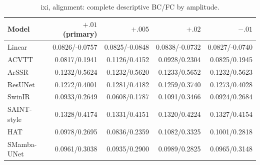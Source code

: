 \begin{table}[t]\centering\scriptsize

\caption{ixi, alignment: complete descriptive BC/FC by amplitude.}

\begin{tabular}{lrrrr}\toprule Model & $+.01$ (primary) & $+.005$ & $+.02$ & $-.01$\\\midrule

Linear & 0.0826/-0.0757 & 0.0825/-0.0848 & 0.0838/-0.0732 & 0.0827/-0.0740\\

ACVTT & 0.0817/0.1941 & 0.1126/0.4152 & 0.0928/0.2304 & 0.0825/0.1945\\

ArSSR & 0.1232/0.5624 & 0.1232/0.5620 & 0.1233/0.5652 & 0.1232/0.5623\\

ResUNet & 0.1272/0.4001 & 0.1281/0.4182 & 0.1259/0.3740 & 0.1273/0.4028\\

SwinIR & 0.0933/0.2649 & 0.0608/0.1787 & 0.1091/0.3466 & 0.0924/0.2684\\

SAINT-style & 0.1328/0.4174 & 0.1331/0.4151 & 0.1320/0.4224 & 0.1327/0.4154\\

HAT & 0.0978/0.2695 & 0.0836/0.2359 & 0.1082/0.3325 & 0.1001/0.2818\\

SMamba-UNet & 0.0961/0.3038 & 0.0935/0.2900 & 0.0989/0.2825 & 0.0965/0.3148\\

\bottomrule\end{tabular}\end{table}

